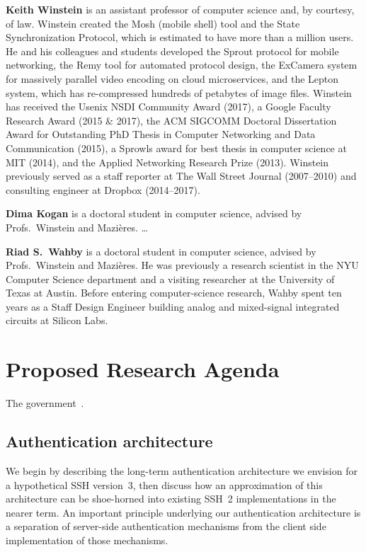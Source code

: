 \documentclass[11pt]{article}
\newcommand{\slim}{\vspace{\baselineskip}}
\begin{document}
\noindent \textbf{Keith Winstein} is an assistant professor of computer science
and, by courtesy, of law. Winstein created the Mosh (mobile shell)
tool and the State Synchronization Protocol, which is estimated to
have more than a million users. He and his colleagues and students
developed the Sprout protocol for mobile networking, the Remy tool for
automated protocol design, the ExCamera system for massively parallel
video encoding on cloud microservices, and the Lepton system, which
has re-compressed hundreds of petabytes of image files. Winstein has
received the Usenix NSDI Community Award (2017), a Google Faculty
Research Award (2015 \& 2017), the ACM SIGCOMM Doctoral Dissertation
Award for Outstanding PhD Thesis in Computer Networking and Data
Communication (2015), a Sprowls award for best thesis in computer
science at MIT (2014), and the Applied Networking Research Prize
(2013). Winstein previously served as a staff reporter at The Wall
Street Journal (2007--2010) and consulting engineer at Dropbox
(2014--2017).

\slim

\noindent \textbf{Dima Kogan} is a doctoral student in computer science,
advised by Profs.~Winstein and Mazi\`{e}res. \ldots

\slim

\noindent \textbf{Riad S.~Wahby} is a doctoral student in computer science,
advised by Profs.~Winstein and Mazi\`{e}res. He was previously a
research scientist in the NYU Computer Science department and a
visiting researcher at the University of Texas at Austin. Before
entering computer-science research, Wahby spent ten years as a Staff
Design Engineer building analog and mixed-signal integrated circuits
at Silicon Labs.


\section{Proposed Research Agenda}

The government~\cite{cyberframework, nistSSH, trumpeo}.


\subsection{Authentication architecture}

We begin by describing the long-term authentication architecture we
envision for a hypothetical SSH version~3, then discuss how an
approximation of this architecture can be shoe-horned into existing
SSH~2 implementations in the nearer term.  An important principle
underlying our authentication architecture is a separation of
server-side authentication mechanisms from the client side
implementation of those mechanisms.
\end{document}

